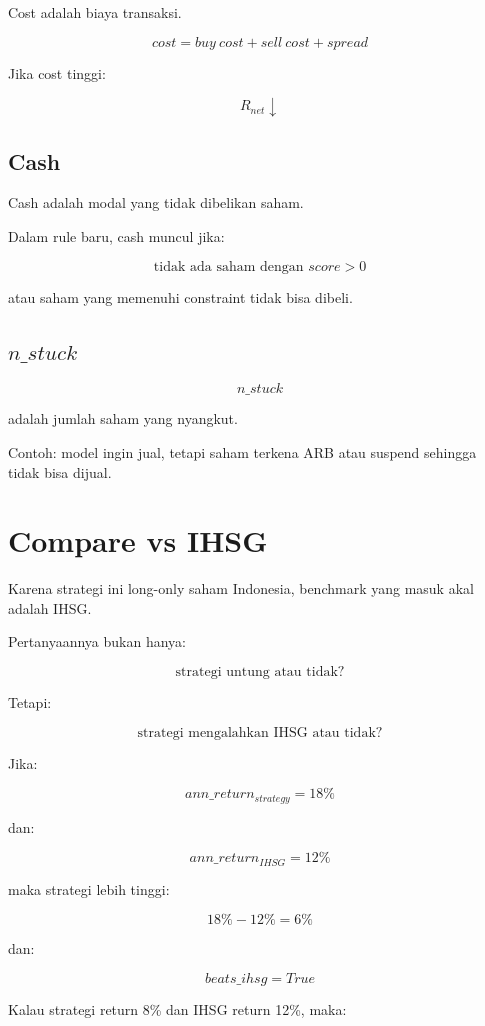 \documentclass[11pt,a4paper]{article}
\begin{document}
Cost adalah biaya transaksi.

\[
cost = buy\ cost + sell\ cost + spread
\]

Jika cost tinggi:

\[
R_{net} \downarrow
\]

\subsection{Cash}

Cash adalah modal yang tidak dibelikan saham.

Dalam rule baru, cash muncul jika:

\[
\text{tidak ada saham dengan } score > 0
\]

atau saham yang memenuhi constraint tidak bisa dibeli.

\subsection{\texorpdfstring{$n\_stuck$}{n\_stuck}}

\[
n\_stuck
\]

adalah jumlah saham yang nyangkut.

Contoh: model ingin jual, tetapi saham terkena ARB atau suspend sehingga tidak bisa dijual.

\section{Compare vs IHSG}

Karena strategi ini long-only saham Indonesia, benchmark yang masuk akal adalah IHSG.

Pertanyaannya bukan hanya:

\[
\text{strategi untung atau tidak?}
\]

Tetapi:

\[
\boxed{
\text{strategi mengalahkan IHSG atau tidak?}
}
\]

Jika:

\[
ann\_return_{strategy} = 18\%
\]

dan:

\[
ann\_return_{IHSG} = 12\%
\]

maka strategi lebih tinggi:

\[
18\% - 12\% = 6\%
\]

dan:

\[
beats\_ihsg = True
\]

Kalau strategi return 8\% dan IHSG return 12\%, maka:
\end{document}

